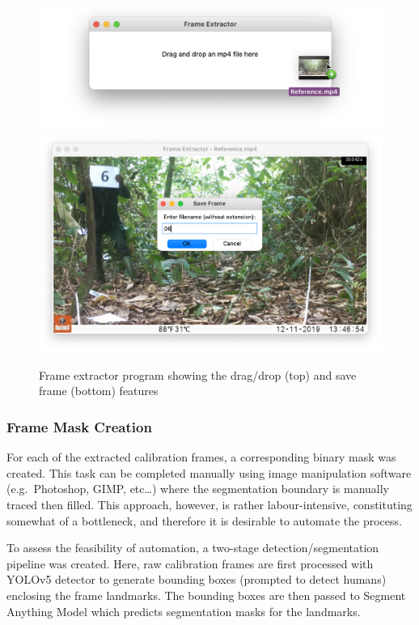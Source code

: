 \begin{figure}[htbp]
    \centering
    \includegraphics[scale=0.5]{body/experimental/assets/frame_extractor/drag_drop}
    \vspace{-3mm}
    \includegraphics[scale=0.5]{body/experimental/assets/frame_extractor/save_frame}
    \caption{Frame extractor program showing the drag/drop (top) and save frame (bottom) features}
    \label{fig:frame_extractor}
\end{figure}

\clearpage

\subsubsection{Frame Mask Creation}\label{subsubsec:mask_creation}

For each of the extracted calibration frames, a corresponding binary mask was created.
This task can be completed manually using image manipulation software (e.g.\ Photoshop,
GIMP, etc\ldots) where the segmentation boundary is manually traced then filled.
This approach, however, is rather labour-intensive, constituting somewhat
of a bottleneck, and therefore it is desirable to automate the process.

To assess the feasibility of automation, a two-stage detection/segmentation pipeline was
created.
Here, raw calibration frames are first processed with YOLOv5 detector\cite{YOLO} to
generate bounding boxes (prompted to detect humans) enclosing the frame landmarks.
The bounding boxes are then passed to Segment Anything Model which predicts segmentation
masks for the landmarks.

